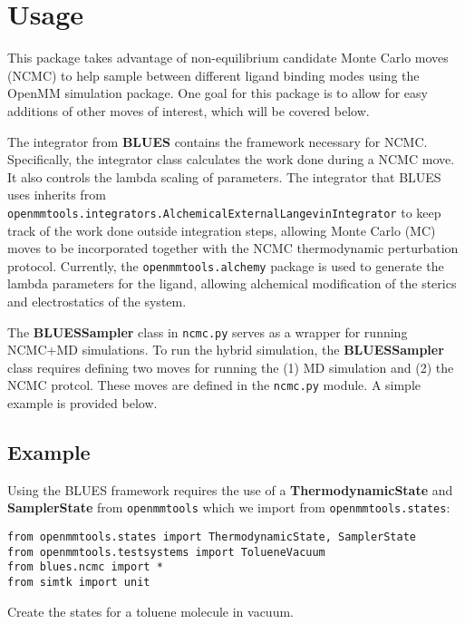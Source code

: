 \hypertarget{usage}{%
\section{Usage}\label{usage}}

This package takes advantage of non-equilibrium candidate Monte Carlo
moves (NCMC) to help sample between different ligand binding modes using
the OpenMM simulation package. One goal for this package is to allow for
easy additions of other moves of interest, which will be covered below.

The integrator from \textbf{BLUES} contains the framework necessary for
NCMC. Specifically, the integrator class calculates the work done during
a NCMC move. It also controls the lambda scaling of parameters. The
integrator that BLUES uses inherits from
\texttt{openmmtools.integrators.AlchemicalExternalLangevinIntegrator} to
keep track of the work done outside integration steps, allowing Monte
Carlo (MC) moves to be incorporated together with the NCMC thermodynamic
perturbation protocol. Currently, the \texttt{openmmtools.alchemy}
package is used to generate the lambda parameters for the ligand,
allowing alchemical modification of the sterics and electrostatics of
the system.

The \textbf{BLUESSampler} class in \texttt{ncmc.py} serves as a wrapper
for running NCMC+MD simulations. To run the hybrid simulation, the
\textbf{BLUESSampler} class requires defining two moves for running the
(1) MD simulation and (2) the NCMC protcol. These moves are defined in
the \texttt{ncmc.py} module. A simple example is provided below.

\hypertarget{example}{%
\subsection*{Example}\label{example}}

Using the BLUES framework requires the use of a
\textbf{ThermodynamicState} and \textbf{SamplerState} from
\texttt{openmmtools} which we import from \texttt{openmmtools.states}:

\begin{verbatim}
from openmmtools.states import ThermodynamicState, SamplerState
from openmmtools.testsystems import TolueneVacuum
from blues.ncmc import *
from simtk import unit
\end{verbatim}

Create the states for a toluene molecule in vacuum.

